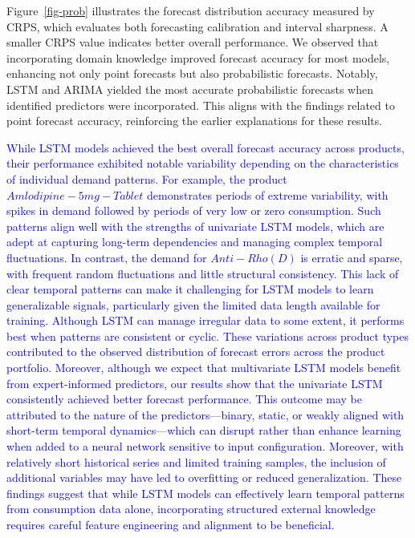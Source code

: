\documentclass[
  authoryear,
  preprint,
  3p]{elsarticle}
\begin{document}
Figure~\ref{fig-prob} illustrates the forecast distribution accuracy
measured by CRPS, which evaluates both forecasting calibration and
interval sharpness. A smaller CRPS value indicates better overall
performance. We observed that incorporating domain knowledge improved
forecast accuracy for most models, enhancing not only point forecasts
but also probabilistic forecasts. Notably, LSTM and ARIMA yielded the
most accurate probabilistic forecasts when identified predictors were
incorporated. This aligns with the findings related to point forecast
accuracy, reinforcing the earlier explanations for these results.

\textcolor{blue}{While LSTM models achieved the best overall forecast accuracy across products, their performance exhibited notable variability depending on the characteristics of individual demand patterns. For example, the product $Amlodipine - 5mg - Tablet$ demonstrates periods of extreme variability, with spikes in demand followed by periods of very low or zero consumption. Such patterns align well with the strengths of univariate LSTM models, which are adept at capturing long-term dependencies and managing complex temporal fluctuations. In contrast, the demand for $Anti-Rho (D)$ is erratic and sparse, with frequent random fluctuations and little structural consistency. This lack of clear temporal patterns can make it challenging for LSTM models to learn generalizable signals, particularly given the limited data length available for training. Although LSTM can manage irregular data to some extent, it performs best when patterns are consistent or cyclic. These variations across product types contributed to the observed distribution of forecast errors across the product portfolio. Moreover, although we expect that multivariate LSTM models benefit from expert-informed predictors, our results show that the univariate LSTM consistently achieved better forecast performance. This outcome may be attributed to the nature of the predictors—binary, static, or weakly aligned with short-term temporal dynamics—which can disrupt rather than enhance learning when added to a neural network sensitive to input configuration. Moreover, with relatively short historical series and limited training samples, the inclusion of additional variables may have led to overfitting or reduced generalization. These findings suggest that while LSTM models can effectively learn temporal patterns from consumption data alone, incorporating structured external knowledge requires careful feature engineering and alignment to be beneficial.}
\end{document}
